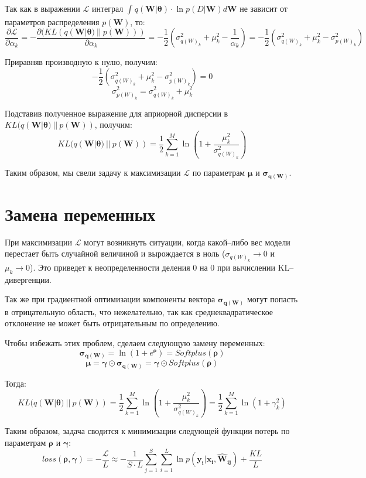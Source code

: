 \documentclass{article}
\begin{document}
Так как в выражении $\mathcal{L}$ интеграл $\int_{}{} q(\pmb{W} | \pmb{\theta}) \cdot \ln{p(D | \pmb{W})} d \pmb{W}$ не зависит от параметров распределения $p(\pmb{W})$, то:
\[
\dfrac{\partial \mathcal{L}}{\partial {\alpha_k}} =
- \dfrac{\partial (KL(q(\pmb{W} | \pmb{\theta})~||~p(\pmb{W})))}{\partial {\alpha_k}} =
-\dfrac{1}{2}(\sigma_{{q(W)_{k}}}^2 + \mu_{k}^2 - \dfrac{1}{\alpha_k}) =
-\dfrac{1}{2}(\sigma_{{q(W)_{k}}}^2 + \mu_{k}^2 - \sigma_{{p(W)_{k}}}^2)
\]

Приравняв производную к нулю, получим:
\[
-\dfrac{1}{2}(\sigma_{{q(W)_{k}}}^2 + \mu_{k}^2 - \sigma_{{p(W)_{k}}}^2) = 0
\]\[
\sigma_{{p(W)_{k}}}^2 = \sigma_{{q(W)_{k}}}^2 + \mu_{k}^2
\]

Подставив полученное выражение для априорной дисперсии в $KL(q(\pmb{W} | \pmb{\theta})~||~p(\pmb{W}))$, получим:
\[
KL(q(\pmb{W} | \pmb{\theta})~||~p(\pmb{W})) =
\dfrac{1}{2}\sum_{k=1}^{M}\ln({1 + \dfrac{\mu_{k}^2}{\sigma_{{q(W)_{k}}}^2}})
\]

Таким образом, мы свели задачу к максимизации $\mathcal{L}$ по параметрам $\pmb{\mu}$ и $\pmb{\sigma_{q(W)}}$.

\section{Замена переменных}

При максимизации $\mathcal{L}$ могут возникнуть ситуации, когда какой--либо вес модели перестает быть случайной величиной и вырождается в ноль ($\sigma_{{q(W)_{k}}} \rightarrow 0$ и $\mu_{k} \rightarrow 0$). Это приведет к неопределенности деления 0 на 0 при вычислении KL--дивергенции.

Так же при градиентной оптимизации компоненты вектора $\pmb{\sigma_{q(\pmb{W})}}$ могут попасть в отрицательную область, что нежелательно, так как среднеквадратическое отклонение не может быть отрицательным по определению.

Чтобы избежать этих проблем, сделаем следующую замену переменных:
\[
 \pmb{\sigma_{q(\pmb{W})}} = \ln({1 + e^{\pmb{\rho}}}) = Softplus (\pmb{\rho})
\]\[
 \pmb{\mu} = \pmb{\gamma} \odot \pmb{\sigma_{q(\pmb{W})}} = \pmb{\gamma} \odot Softplus (\pmb{\rho})
\]

Тогда:
\[
KL(q(\pmb{W} | \pmb{\theta})~||~p(\pmb{W})) =
\dfrac{1}{2}\sum_{k=1}^{M}\ln({1 + \dfrac{\mu_{k}^2}{\sigma_{{q(W)_{k}}}^2}}) =
\dfrac{1}{2}\sum_{k=1}^{M}\ln({1 + \gamma_{k}^{2}})
\]

Таким образом, задача сводится к минимизации следующей функции потерь по параметрам $\pmb{\rho}$ и $\pmb{\gamma}$:
\[
loss(\pmb{\rho}, \pmb{\gamma}) =
- \dfrac{\mathcal{L}}{L} \approx
 -\dfrac{1}{S \cdot L} \sum_{j=1}^S \sum_{i=1}^{L}  {\ln{p(\pmb{y_{i}} | \pmb{x_{i}}, \pmb{\hat{W}_{ij}})}} + \dfrac{KL}{L}
\]
\end{document}
